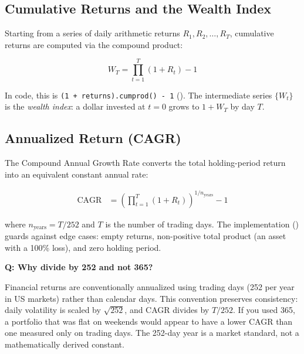 
\subsection{Cumulative Returns and the Wealth Index}

Starting from a series of daily arithmetic returns $R_1, R_2, \ldots, R_T$, cumulative returns are computed via the compound product:

\begin{equation}
  W_T = \prod_{t=1}^{T} (1 + R_t) - 1
  \label{eq:cumulative-return}
\end{equation}

In code, this is \texttt{(1 + returns).cumprod() - 1} (). The intermediate series $\{W_t\}$ is the \emph{wealth index}: a dollar invested at $t=0$ grows to $1 + W_T$ by day $T$.

\subsection{Annualized Return (CAGR)}

The Compound Annual Growth Rate converts the total holding-period return into an equivalent constant annual rate:

\begin{align}
  \text{CAGR} &= \left(\prod_{t=1}^{T}(1+R_t)\right)^{1/n_{\text{years}}} - 1 \label{eq:cagr}
\end{align}

where $n_{\text{years}} = T / 252$ and $T$ is the number of trading days. The implementation () guards against edge cases: empty returns, non-positive total product (an asset with a 100\% loss), and zero holding period.

\begin{interviewbox}
  \textbf{Q: Why divide by 252 and not 365?}

  Financial returns are conventionally annualized using trading days (252 per year in US markets) rather than calendar days. This convention preserves consistency: daily volatility is scaled by $\sqrt{252}$, and CAGR divides by $T/252$. If you used 365, a portfolio that was flat on weekends would appear to have a lower CAGR than one measured only on trading days. The 252-day year is a market standard, not a mathematically derived constant.
\end{interviewbox}

